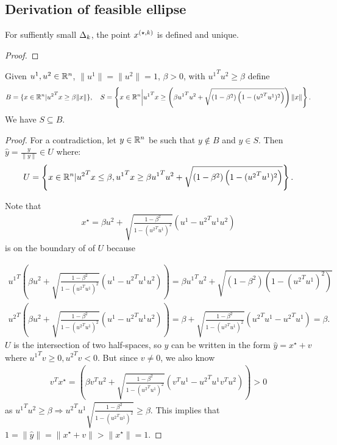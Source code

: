 \subsection{Derivation of feasible ellipse}


\begin{theorem}
For suffiently small $\Delta_k$, the point ${x^{(\star, k)}}$ is defined and unique.
\end{theorem}

\begin{proof}
\end{proof}




\begin{theorem}
\label{cone_subset_cone}
Given $u^1, u^2 \in {\mathbb R^{n}}$, $\|u^1\| = \|u^2\|= 1$, $\beta >0$, with ${u^1}^Tu^2 \ge \beta$ define
\begin{align*}
B = \{x\in{\mathbb R^{n}} | {u^2}^Tx \ge \beta\|x\|\}, \quad
S = \left\{x\in{\mathbb R^{n}} \bigg| {u^1}^Tx \ge \left(\beta {u^1}^Tu^2 + \sqrt{(1 - \beta^2)\left(1 - ({u^2}^Tu^1)^2\right)}\right)\|x\| \right\}. 
\end{align*}
We have $S \subseteq B$.
\end{theorem}


\begin{proof}
For a contradiction, let $y \in {\mathbb R^{n}}$ be such that $y \not \in B$ and $y \in S$.
Then $\hat y = \frac{y}{\|y\|} \in U$ where:
\begin{align*}
U = \left\{x \in {\mathbb R^{n}} | {u^2}^Tx \le \beta, {u^1}^Tx \ge \beta {u^1}^Tu^2 + \sqrt{(1 - \beta^2)\left(1 - ({u^2}^Tu^1)^2\right)} \right\}.
\end{align*}

Note that
\begin{align*}
x^{\star} = \beta u^2 + \sqrt{\frac{1 - \beta^2}{1 - ({u^2}^Tu^1)^2}} (u^1 - {u^2}^Tu^1 u^2 )
\end{align*}
is on the boundary of of $U$ because

\begin{align*}
{u^1}^T\left(\beta u^2 + \sqrt{\frac{1 - \beta^2}{1 - ({u^2}^Tu^1)^2}} (u^1 - {u^2}^Tu^1 u^2 )\right) = 
\beta {u^1}^Tu^2 + \sqrt{(1 - \beta^2)\left(1 - ({u^2}^Tu^1)^2\right)} \\
{u^2}^T\left(\beta u^2 + \sqrt{\frac{1 - \beta^2}{1 - ({u^2}^Tu^1)^2}} (u^1 - {u^2}^Tu^1 u^2 )\right) = 
\beta + \sqrt{\frac{1 - \beta^2}{1 - ({u^2}^Tu^1)^2}} ({u^2}^Tu^1 - {u^2}^Tu^1 ) = \beta.
\end{align*}
$U$ is the intersection of two half-spaces, so $\hat y$ can be written in the form $\hat y = x^{\star} + v$ where ${u^1}^Tv \ge 0, {u^2}^Tv < 0$.
But since $v \ne 0$, we also know
\begin{align*}
{v}^Tx^{\star} = 
\left(\beta {v}^Tu^2 + \sqrt{\frac{1 - \beta^2}{1 - ({u^2}^Tu^1)^2}} ({v}^Tu^1 - {u^2}^Tu^1 {v}^Tu^2 )\right) > 0
\end{align*}
as ${u^1}^Tu^2 \ge \beta \Longrightarrow {u^2}^Tu^1\sqrt{\frac{1 - \beta^2}{1 - ({u^2}^Tu^1)^2}} \ge \beta$.
This implies that $1 = \|\hat y\| = \|x^{\star} + v\| > \|x^{\star}\| = 1$.
\end{proof}






